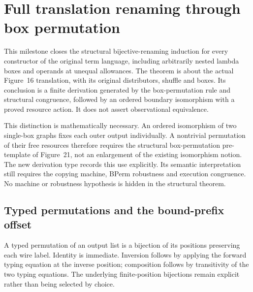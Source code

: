 \clearpage
\section{Full translation renaming through box permutation}
\label{sec:copying-full-renaming}
This milestone closes the structural bijective-renaming induction for every
constructor of the original term language, including arbitrarily nested lambda
boxes and operands at unequal allowances. The theorem is about the actual
Figure~16 translation, with its original distributors, shuffle and boxes. Its
conclusion is a finite derivation generated by the box-permutation rule and
structural congruence, followed by an ordered boundary isomorphism with a proved
resource action. It does not assert observational equivalence.

This distinction is mathematically necessary. An ordered isomorphism of two
single-box graphs fixes each outer output individually. A nontrivial permutation
of their free resources therefore requires the structural box-permutation
pre-template of Figure~21, not an enlargement of the existing isomorphism notion.
The new derivation type records this use explicitly. Its semantic interpretation
still requires the copying machine, BPerm robustness and execution congruence.
No machine or robustness hypothesis is hidden in the structural theorem.


\subsection{Typed permutations and the bound-prefix offset}

A typed permutation of an output list is a bijection of its positions preserving
each wire label. Identity is immediate. Inversion follows by applying the forward
typing equation at the inverse position; composition follows by transitivity of
the two typing equations. The underlying finite-position bijections remain
explicit rather than being selected by choice.





